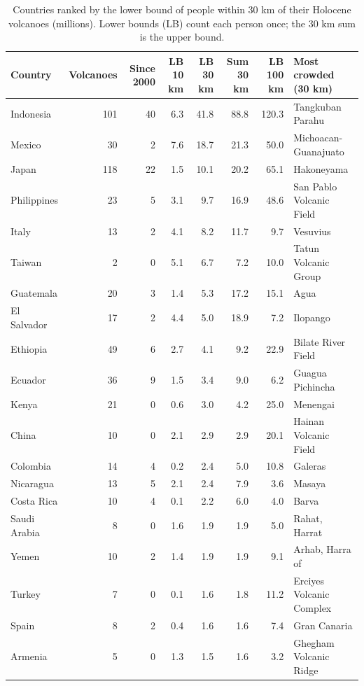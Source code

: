 \documentclass[11pt,a4paper]{article}
\begin{document}
\begin{table}[tbp]\centering\footnotesize\caption{Countries ranked by the lower bound of people within 30 km of their Holocene volcanoes (millions). Lower bounds (LB) count each person once; the 30 km sum is the upper bound.}\label{tab:countries}\setlength{\tabcolsep}{4pt}\begin{tabular}{lrrrrrrl}\toprule Country & Volcanoes & Since 2000 & LB 10 km & LB 30 km & Sum 30 km & LB 100 km & Most crowded (30 km)\\\midrule
Indonesia & 101 & 40 & 6.3 & 41.8 & 88.8 & 120.3 & Tangkuban Parahu\\
Mexico & 30 & 2 & 7.6 & 18.7 & 21.3 & 50.0 & Michoacan-Guanajuato\\
Japan & 118 & 22 & 1.5 & 10.1 & 20.2 & 65.1 & Hakoneyama\\
Philippines & 23 & 5 & 3.1 & 9.7 & 16.9 & 48.6 & San Pablo Volcanic Field\\
Italy & 13 & 2 & 4.1 & 8.2 & 11.7 & 9.7 & Vesuvius\\
Taiwan & 2 & 0 & 5.1 & 6.7 & 7.2 & 10.0 & Tatun Volcanic Group\\
Guatemala & 20 & 3 & 1.4 & 5.3 & 17.2 & 15.1 & Agua\\
El Salvador & 17 & 2 & 4.4 & 5.0 & 18.9 & 7.2 & Ilopango\\
Ethiopia & 49 & 6 & 2.7 & 4.1 & 9.2 & 22.9 & Bilate River Field\\
Ecuador & 36 & 9 & 1.5 & 3.4 & 9.0 & 6.2 & Guagua Pichincha\\
Kenya & 21 & 0 & 0.6 & 3.0 & 4.2 & 25.0 & Menengai\\
China & 10 & 0 & 2.1 & 2.9 & 2.9 & 20.1 & Hainan Volcanic Field\\
Colombia & 14 & 4 & 0.2 & 2.4 & 5.0 & 10.8 & Galeras\\
Nicaragua & 13 & 5 & 2.1 & 2.4 & 7.9 & 3.6 & Masaya\\
Costa Rica & 10 & 4 & 0.1 & 2.2 & 6.0 & 4.0 & Barva\\
Saudi Arabia & 8 & 0 & 1.6 & 1.9 & 1.9 & 5.0 & Rahat, Harrat\\
Yemen & 10 & 2 & 1.4 & 1.9 & 1.9 & 9.1 & Arhab, Harra of\\
Turkey & 7 & 0 & 0.1 & 1.6 & 1.8 & 11.2 & Erciyes Volcanic Complex\\
Spain & 8 & 2 & 0.4 & 1.6 & 1.6 & 7.4 & Gran Canaria\\
Armenia & 5 & 0 & 1.3 & 1.5 & 1.6 & 3.2 & Ghegham Volcanic Ridge\\
\bottomrule\end{tabular}\end{table}
\end{document}
